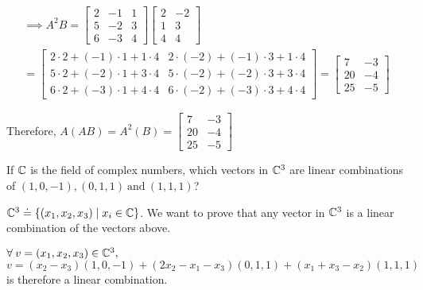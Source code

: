 \documentclass[a4paper, 11pt]{article}
\begin{document}
\begin{solution}
    \begin{multline*}
        \implies A^2B = \left[\begin{array}{ccc}
                2 & -1 & 1 \\
                5 & -2 & 3 \\
                6 & -3 & 4
            \end{array}\right]\left[\begin{array}{cc}
                2 & -2 \\
                1 & 3  \\
                4 & 4
            \end{array}\right]
        \\
        = \left[\begin{array}{cc}
                2 \cdot 2 + (-1) \cdot 1 + 1 \cdot 4 & 2 \cdot (-2) + (-1) \cdot 3 + 1 \cdot 4 \\
                5 \cdot 2 + (-2) \cdot 1 + 3 \cdot 4 & 5 \cdot (-2) + (-2) \cdot 3 + 3 \cdot 4 \\
                6 \cdot 2 + (-3) \cdot 1 + 4 \cdot 4 & 6 \cdot (-2) + (-3) \cdot 3 + 4 \cdot 4
            \end{array}\right]
        = \left[\begin{array}{cc}
                7  & -3 \\
                20 & -4 \\
                25 & -5
            \end{array}\right]
    \end{multline*}

    Therefore, \(A(AB) = A^2(B) = \left[\begin{array}{cc}
            7  & -3 \\
            20 & -4 \\
            25 & -5
        \end{array}\right]\)
\end{solution}
\begin{problem} 
If \(\mathbb{C}\) is the field of complex numbers, which vectors in \(\mathbb{C}^3\) are linear combinations of \((1, 0, -1), (0, 1, 1) \:\text{and}\: (1, 1, 1)\)?
\end{problem}
\begin{solution}
    \(\mathbb{C}^3 \doteq \{(x_1, x_2, x_3) \mid x_i \in \mathbb{C}\}\). We want to prove that any vector in \(\mathbb{C}^3\) is a linear combination of the vectors above.

    \(\forall v = (x_1, x_2, x_3) \in \bbc^3, \)
    \[
        v = (x_2-x_3)(1, 0, -1) + (2x_2 - x_1 - x_3)(0, 1, 1) + (x_1+x_3-x_2)(1,1,1)
    \]
    is therefore a linear combination.
\end{solution}
\end{document}

